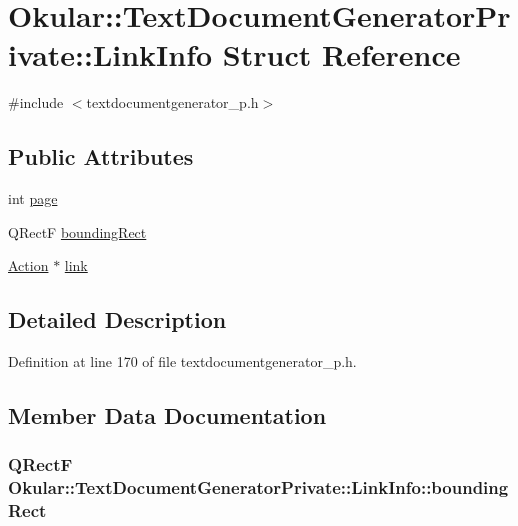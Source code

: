 \hypertarget{structOkular_1_1TextDocumentGeneratorPrivate_1_1LinkInfo}{\section{Okular\+:\+:Text\+Document\+Generator\+Private\+:\+:Link\+Info Struct Reference}
\label{structOkular_1_1TextDocumentGeneratorPrivate_1_1LinkInfo}
}


{\ttfamily \#include $<$textdocumentgenerator\+\_\+p.\+h$>$}

\subsection*{Public Attributes}
\begin{DoxyCompactItemize}
\item 
int \hyperlink{structOkular_1_1TextDocumentGeneratorPrivate_1_1LinkInfo_aa123a5ca9189d3638522328da29e80b4}{page}
\item 
Q\+Rect\+F \hyperlink{structOkular_1_1TextDocumentGeneratorPrivate_1_1LinkInfo_a29304f2dd84c1943c1dcec62baabc5c1}{bounding\+Rect}
\item 
\hyperlink{classOkular_1_1Action}{Action} $\ast$ \hyperlink{structOkular_1_1TextDocumentGeneratorPrivate_1_1LinkInfo_a1b29014996bb28edc4c5cbb4ebc45d7f}{link}
\end{DoxyCompactItemize}


\subsection{Detailed Description}


Definition at line 170 of file textdocumentgenerator\+\_\+p.\+h.



\subsection{Member Data Documentation}
\hypertarget{structOkular_1_1TextDocumentGeneratorPrivate_1_1LinkInfo_a29304f2dd84c1943c1dcec62baabc5c1}{
\subsubsection[{bounding\+Rect}]{\setlength{\rightskip}{0pt plus 5cm}Q\+Rect\+F Okular\+::\+Text\+Document\+Generator\+Private\+::\+Link\+Info\+::bounding\+Rect}}\label{structOkular_1_1TextDocumentGeneratorPrivate_1_1LinkInfo_a29304f2dd84c1943c1dcec62baabc5c1}


